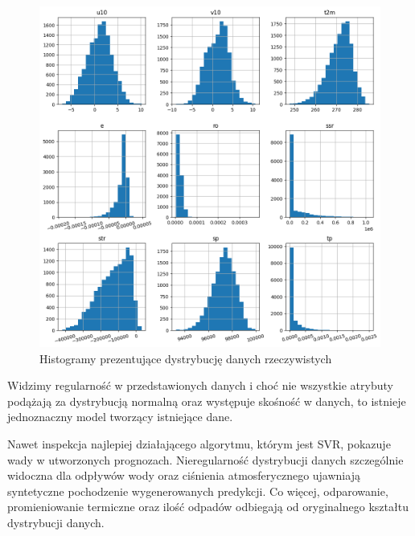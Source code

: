 \begin{figure}[H]
    \centering
    \includegraphics[width=\textwidth]{images/hist.png}
    \caption{Histogramy prezentujące dystrybucję danych rzeczywistych}
    \label{real-hist}
\end{figure}

Widzimy regularność w przedstawionych danych i choć nie wszystkie atrybuty podążają za dystrybucją normalną 
oraz występuje skośność w danych, to istnieje jednoznaczny model tworzący istniejące dane.

Nawet inspekcja najlepiej działającego algorytmu, którym jest SVR, pokazuje wady w utworzonych 
prognozach. Nieregularność dystrybucji danych szczególnie widoczna dla odpływów wody oraz
ciśnienia atmosferycznego ujawniają syntetyczne pochodzenie wygenerowanych predykcji. 
Co więcej, odparowanie, promieniowanie termiczne oraz ilość odpadów odbiegają od oryginalnego kształtu
dystrybucji danych.

